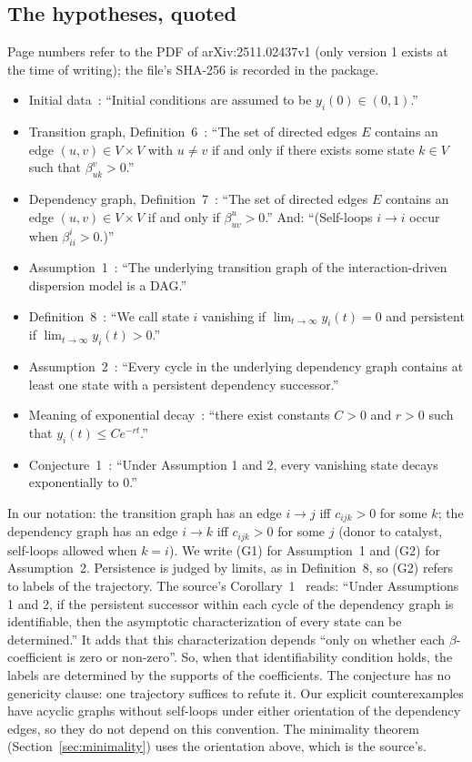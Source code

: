 \documentclass[11pt,a4paper]{article}
\theoremstyle{definition}\newtheorem{definition}[theorem]{Definition}
\theoremstyle{remark}\newtheorem{remark}[theorem]{Remark}
\begin{document}
\subsection{The hypotheses, quoted}
\label{sec:quotes}
Page numbers refer to the PDF of arXiv:2511.02437v1 (only version
1 exists at the time of writing); the file's SHA-256 is recorded in the
package.
\begin{itemize}
\item Initial data~\cite[p.~6]{CCM}: ``Initial conditions are assumed to
be $y_i(0)\in(0,1)$.''
\item Transition graph, Definition~6~\cite[p.~7]{CCM}: ``The set of
directed edges $E$ contains an edge $(u,v)\in V\times V$ with $u\ne v$
if and only if there exists some state $k\in V$ such that
$\beta^v_{uk}>0$.''
\item Dependency graph, Definition~7~\cite[p.~8]{CCM}: ``The set of
directed edges $E$ contains an edge $(u,v)\in V\times V$ if and only if
$\beta^u_{uv}>0$.'' And: ``(Self-loops $i\to i$ occur when
$\beta^i_{ii}>0$.)''
\item Assumption~1~\cite[p.~11]{CCM}: ``The underlying transition graph
of the interaction-driven dispersion model is a DAG.''
\item Definition~8~\cite[p.~14]{CCM}: ``We call state $i$ vanishing if
$\lim_{t\to\infty}y_i(t)=0$ and persistent if
$\lim_{t\to\infty}y_i(t)>0$.''
\item Assumption~2~\cite[p.~15]{CCM}: ``Every cycle in the underlying
dependency graph contains at least one state with a persistent
dependency successor.''
\item Meaning of exponential decay~\cite[§3.3, p.~24]{CCM}: ``there
exist constants $C>0$ and $r>0$ such that $y_i(t)\le Ce^{-rt}$.''
\item Conjecture~1~\cite[p.~25]{CCM}: ``Under Assumption 1 and 2,
every vanishing state decays exponentially to 0.''
\end{itemize}
In our notation: the transition graph has an edge $i\to j$ iff
$c_{ijk}>0$ for some $k$; the dependency graph has an edge $i\to k$ iff
$c_{ijk}>0$ for some $j$ (donor to catalyst, self-loops allowed when
$k=i$). We write (G1) for Assumption~1 and (G2) for Assumption~2.
Persistence is judged by limits, as in Definition~8, so (G2) refers to
labels of the trajectory. The source's Corollary~1~\cite[p.~22]{CCM}
reads: ``Under Assumptions 1 and 2, if the persistent successor within
each cycle of the dependency graph is identifiable, then the asymptotic
characterization of every state can be determined.'' It adds that this
characterization depends ``only on whether each $\beta$-coefficient is
zero or non-zero''. So, when that identifiability condition holds, the
labels are determined by the supports of the coefficients.
The conjecture has no genericity clause: one trajectory suffices to
refute it. Our explicit counterexamples have acyclic graphs without
self-loops under either orientation of the dependency edges, so they do
not depend on this convention. The minimality theorem
(Section~\ref{sec:minimality}) uses the orientation above, which is the
source's.
\end{document}

